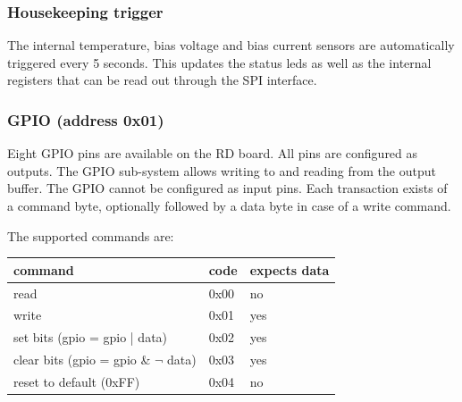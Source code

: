 \documentclass[a4paper,indent]{paper}
\begin{document}
\subsubsection{Housekeeping trigger}
The internal temperature, bias voltage and bias current sensors are automatically triggered every 5 seconds.
This updates the status leds as well as the internal registers that can be read out through the \ac{SPI} interface.

\subsubsection{\ac{GPIO} (address 0x01)}
Eight \ac{GPIO} pins are available on the \ac{RD} board. All pins are configured as outputs. The \ac{GPIO} sub-system allows writing to and reading from the output buffer. The \ac{GPIO} cannot be configured as input pins. Each transaction exists of a command byte, optionally followed by a data byte in case of a write command.

The supported commands are:
\begin{center}
  \begin{tabular}{|l|l|l|}
    \hline
    command & code & expects data \\
    \hline
    read & 0x00 & no \\
    write & 0x01 & yes \\
    set bits (gpio = gpio | data) & 0x02 & yes \\
    clear bits (gpio = gpio \& $\neg{}$ data) & 0x03 & yes \\
    reset to default (0xFF) & 0x04 & no \\
    \hline
  \end{tabular}
\end{center}
\end{document}
